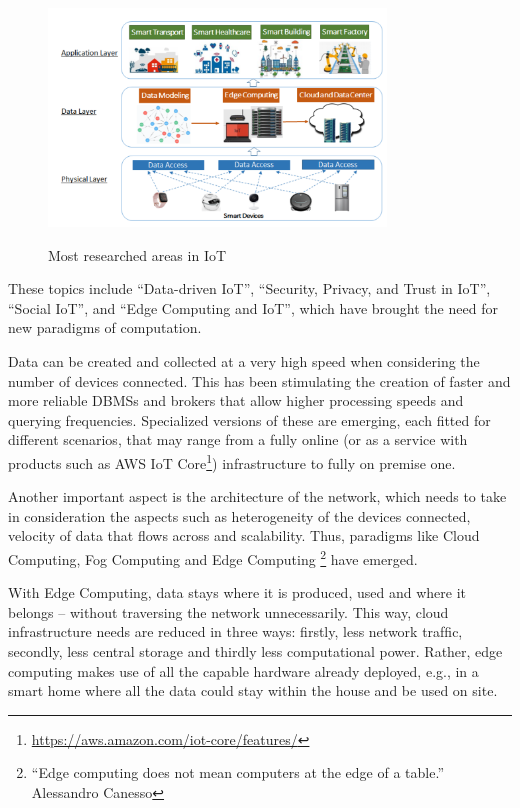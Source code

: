 			\begin{figure}[h]
				\centering
				\includegraphics[width=0.8\textwidth]{resources/img/iot_research_areas}\\
				\caption[Most researched areas in IoT]{Most researched areas in IoT \cite{9319033}}
				\label{iot_research_areas}
			\end{figure}
		
			These topics include ``Data-driven IoT'', ``Security, Privacy, and Trust in IoT'', ``Social IoT'', and ``Edge Computing and IoT'', which have brought the need for new paradigms of computation.
			
			Data can be created and collected at a very high speed when considering the number of devices connected.
			This has been stimulating the creation of faster and more reliable DBMSs and brokers that allow higher processing speeds and querying frequencies.
			Specialized versions of these are emerging, each fitted for different scenarios, that may range from a fully online (or as a service with products such as AWS IoT Core\footnote{\url{https://aws.amazon.com/iot-core/features/}}) infrastructure to fully on premise one.
			
			Another important aspect is the architecture of the network, which needs to take in consideration the aspects such as heterogeneity of the devices connected, velocity of data that flows across and scalability.
			Thus, paradigms like Cloud Computing, Fog Computing and Edge Computing \footnote{``Edge computing does not mean computers at the edge of a table.'' Alessandro Canesso} have emerged.
			
			With Edge Computing, data stays where it is produced, used and where it belongs – without traversing the network unnecessarily.
			This way, cloud infrastructure needs are reduced in three ways: ﬁrstly, less network trafﬁc, secondly, less central storage and thirdly less computational power. Rather, edge	computing makes use of all the capable hardware already
			deployed, e.g., in a smart home where all the data could
			stay within the house and be used on site.
			
